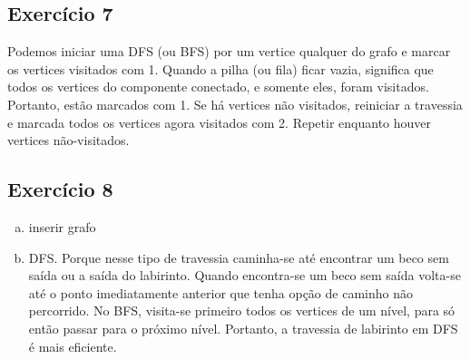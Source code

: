 \subsection{Exercício 7}\label{sec:exer7}
Podemos iniciar uma DFS (ou BFS) por um vertice qualquer do grafo e marcar os vertices
visitados com 1. Quando a pilha (ou fila) ficar vazia, significa que todos os vertices
do componente conectado, e somente eles, foram visitados. Portanto, estão marcados com 1.
Se há vertices não visitados, reiniciar a travessia e marcada todos os vertices agora
visitados com 2. Repetir enquanto houver vertices não-visitados.

\subsection{Exercício 8}\label{sec:exer8}
\begin{enumerate}[a)]
  \item inserir grafo
  \item DFS. Porque nesse tipo de travessia caminha-se até encontrar um beco sem saída
  ou a saída do labirinto. Quando encontra-se um beco sem saída volta-se até o ponto
  imediatamente anterior que tenha opção de caminho não percorrido. No BFS, visita-se
  primeiro todos os vertices de um nível, para só então passar para o próximo nível.
  Portanto, a travessia de labirinto em DFS é mais eficiente.
\end{enumerate}
